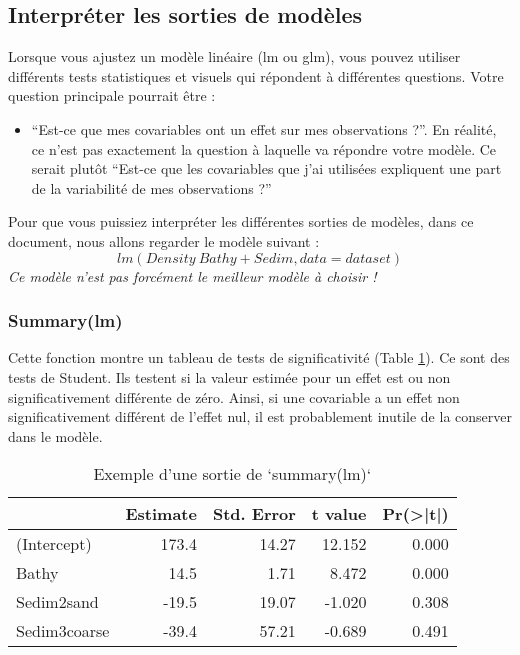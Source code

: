 \documentclass[french,a4paper]{article}
\providecommand{\tightlist}{%
  \setlength{\itemsep}{0pt}\setlength{\parskip}{0pt}}
\begin{document}
\subsection{Interpréter les sorties de
modèles}\label{interpreter-les-sorties-de-modeles}

Lorsque vous ajustez un modèle linéaire (lm ou glm), vous pouvez
utiliser différents tests statistiques et visuels qui répondent à
différentes questions. Votre question principale pourrait être :

\begin{itemize}
\tightlist
\item
  ``Est-ce que mes covariables ont un effet sur mes observations ?''. En
  réalité, ce n'est pas exactement la question à laquelle va répondre
  votre modèle. Ce serait plutôt ``Est-ce que les covariables que j'ai
  utilisées expliquent une part de la variabilité de mes observations
  ?''
\end{itemize}

Pour que vous puissiez interpréter les différentes sorties de modèles,
dans ce document, nous allons regarder le modèle suivant :
\[lm(Density ~ Bathy + Sedim, data = dataset)\] \emph{Ce modèle n'est
pas forcément le meilleur modèle à choisir !}

\subsubsection{Summary(lm)}\label{summarylm}

Cette fonction montre un tableau de tests de significativité (Table
\ref{tab:RTableSummary}). Ce sont des tests de Student. Ils testent si
la valeur estimée pour un effet est ou non significativement différente
de zéro. Ainsi, si une covariable a un effet non significativement
différent de l'effet nul, il est probablement inutile de la conserver
dans le modèle.

\begin{table}

\caption{\label{tab:RTableSummary}Exemple d'une sortie de `summary(lm)`}
\centering
\begin{tabular}[t]{l|r|r|r|r}
\hline
  & Estimate & Std. Error & t value & Pr(>|t|)\\
\hline
(Intercept) & 173.4 & 14.27 & 12.152 & 0.000\\
\hline
Bathy & 14.5 & 1.71 & 8.472 & 0.000\\
\hline
Sedim2sand & -19.5 & 19.07 & -1.020 & 0.308\\
\hline
Sedim3coarse & -39.4 & 57.21 & -0.689 & 0.491\\
\hline
\end{tabular}
\end{table}
\end{document}
